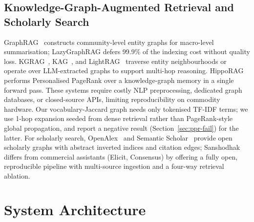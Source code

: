 \documentclass[journal]{IEEEtran}
\begin{document}
\subsection{Knowledge-Graph-Augmented Retrieval and Scholarly Search}
GraphRAG~\cite{edge2024graphrag} constructs community-level entity
graphs for macro-level summarisation; LazyGraphRAG
\cite{microsoft2024lazygraphrag} defers 99.9\% of the indexing cost
without quality loss. KGRAG~\cite{soman2023kgrag},
KAG~\cite{liang2024kag}, and LightRAG~\cite{guo2024lightrag} traverse
entity neighbourhoods or operate over LLM-extracted graphs to
support multi-hop reasoning. HippoRAG~\cite{gutierrez2024hipporag}
performs Personalised PageRank over a knowledge-graph memory in a
single forward pass. These systems require costly NLP preprocessing,
dedicated graph databases, or closed-source APIs, limiting
reproducibility on commodity hardware. Our vocabulary-Jaccard graph
needs only tokenised TF-IDF terms; we use 1-hop expansion seeded from
dense retrieval rather than PageRank-style global propagation, and
report a negative result (Section~\ref{sec:ppr-fail}) for the latter.
For scholarly search, OpenAlex~\cite{priem2022openalex} and Semantic
Scholar~\cite{lo2020s2orc} provide open scholarly graphs with
abstract inverted indices and citation edges; Sanshodhak differs from
commercial assistants (Elicit, Consensus) by offering a fully open,
reproducible pipeline with multi-source ingestion and a four-way
retrieval ablation.

\section{System Architecture}
\label{sec:arch}
\end{document}
